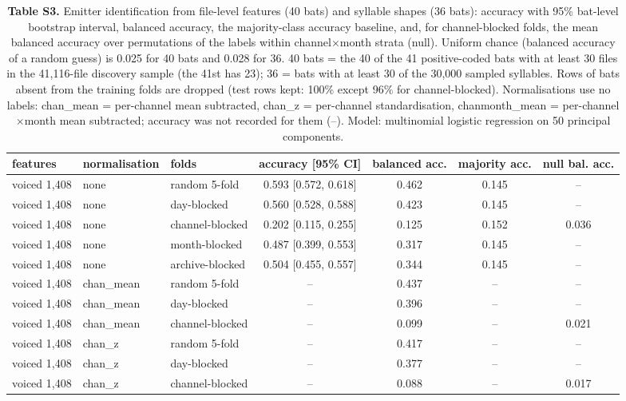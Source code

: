 \begin{table}[htbp]\centering\scriptsize
\caption{\textbf{Table S3.} Emitter identification from file-level features (40 bats) and syllable shapes (36 bats): accuracy with 95\% bat-level bootstrap interval, balanced accuracy, the majority-class accuracy baseline, and, for channel-blocked folds, the mean balanced accuracy over permutations of the labels within channel$\times$month strata (null). Uniform chance (balanced accuracy of a random guess) is 0.025 for 40 bats and 0.028 for 36. 40 bats = the 40 of the 41 positive-coded bats with at least 30 files in the 41,116-file discovery sample (the 41st has 23); 36 = bats with at least 30 of the 30,000 sampled syllables. Rows of bats absent from the training folds are dropped (test rows kept: 100\% except 96\% for channel-blocked). Normalisations use no labels: chan\_mean = per-channel mean subtracted, chan\_z = per-channel standardisation, chanmonth\_mean = per-channel$\times$month mean subtracted; accuracy was not recorded for them (--). Model: multinomial logistic regression on 50 principal components.}\label{tab:S3}
\begin{adjustbox}{max width=\linewidth}
\begin{tabular}{lllcccc}
\toprule
features & normalisation & folds & accuracy [95\% CI] & balanced acc. & majority acc. & null bal. acc. \\
\midrule
voiced 1,408 & none & random 5-fold & 0.593 [0.572, 0.618] & 0.462 & 0.145 & -- \\
voiced 1,408 & none & day-blocked & 0.560 [0.528, 0.588] & 0.423 & 0.145 & -- \\
voiced 1,408 & none & channel-blocked & 0.202 [0.115, 0.255] & 0.125 & 0.152 & 0.036 \\
voiced 1,408 & none & month-blocked & 0.487 [0.399, 0.553] & 0.317 & 0.145 & -- \\
voiced 1,408 & none & archive-blocked & 0.504 [0.455, 0.557] & 0.344 & 0.145 & -- \\
voiced 1,408 & chan\_mean & random 5-fold & -- & 0.437 & -- & -- \\
voiced 1,408 & chan\_mean & day-blocked & -- & 0.396 & -- & -- \\
voiced 1,408 & chan\_mean & channel-blocked & -- & 0.099 & -- & 0.021 \\
voiced 1,408 & chan\_z & random 5-fold & -- & 0.417 & -- & -- \\
voiced 1,408 & chan\_z & day-blocked & -- & 0.377 & -- & -- \\
voiced 1,408 & chan\_z & channel-blocked & -- & 0.088 & -- & 0.017 \\

\end{tabular}
\end{adjustbox}
\end{table}
